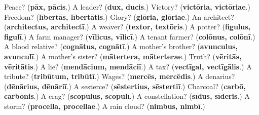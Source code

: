 \begin{tcolorbox}[breakable,colback=teal!4,colframe=teal!35!black,title={Before you move on}]
Peace? (\textbf{pāx, pācis}.) A leader? (\textbf{dux, ducis}.) Victory? (\textbf{victōria, victōriae}.) Freedom? (\textbf{lībertās, lībertātis}.) Glory? (\textbf{glōria, glōriae}.) An architect? (\textbf{architectus, architectī}.) A weaver? (\textbf{textor, textōris}.) A potter? (\textbf{figulus, figulī}.) A farm manager? (\textbf{vīlicus, vīlicī}.) A tenant farmer? (\textbf{colōnus, colōnī}.) A blood relative? (\textbf{cognātus, cognātī}.) A mother's brother? (\textbf{avunculus, avunculī}.) A mother's sister? (\textbf{mātertera, māterterae}.) Truth? (\textbf{vēritās, vēritātis}.) A lie? (\textbf{mendācium, mendāciī}.) A tax? (\textbf{vectīgal, vectīgālis}.) A tribute? (\textbf{tribūtum, tribūtī}.) Wages? (\textbf{mercēs, mercēdis}.) A denarius? (\textbf{dēnārius, dēnāriī}.) A sesterce? (\textbf{sēstertius, sēstertiī}.) Charcoal? (\textbf{carbō, carbōnis}.) A crag? (\textbf{scopulus, scopulī}.) A constellation? (\textbf{sīdus, sīderis}.) A storm? (\textbf{procella, procellae}.) A rain cloud? (\textbf{nimbus, nimbī}.)
\end{tcolorbox}
